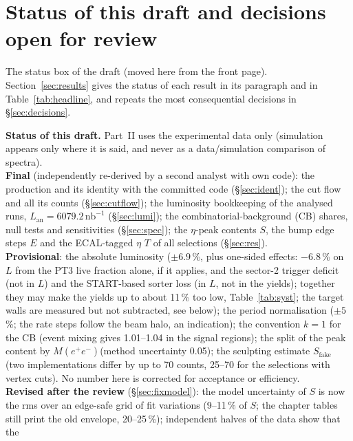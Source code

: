 \documentclass[11pt,a4paper]{article}
\newcommand{\Mee}{\ensuremath{M(e^{+}e^{-})}\xspace}
\newcommand{\nbinv}{\ensuremath{\mathrm{nb}^{-1}}\xspace}
\newcommand{\Lan}{\ensuremath{L_{\mathrm{an}}}\xspace}
\newcommand{\notebox}[1]{\par\noindent\colorbox{orange!10}{\parbox{\dimexpr\linewidth-2\fboxsep\relax}{#1}}\par}
\begin{document}
\section{Status of this draft and decisions open for review}
\label{app:status}
The status box of the draft (moved here from the front page). Section~\ref{sec:results} gives the status of each result in its
paragraph and in Table~\ref{tab:headline}, and repeats the most consequential decisions in \S\ref{sec:decisions}.

\notebox{\textbf{Status of this draft.}
Part~II uses the experimental data only (simulation appears only where it is said, and never as a
data/simulation comparison of spectra).\\[0.3em]
\textbf{Final} (independently re-derived by a second analyst with own code):
the production and its identity with the committed code (\S\ref{sec:ident});
the cut flow and all its counts (\S\ref{sec:cutflow});
the luminosity bookkeeping of the analysed runs, $\Lan = 6079.2\,\nbinv$ (\S\ref{sec:lumi});
the combinatorial-background (CB) shares, null tests and sensitivities (\S\ref{sec:spec});
the $\eta$-peak contents $S$, the bump edge steps $E$ and the ECAL-tagged $\eta$ $T$ of all selections (\S\ref{sec:res}).\\[0.3em]
\textbf{Provisional}: the absolute luminosity ($\pm6.9$\,\%, plus one-sided effects: $-6.8$\,\% on $L$ from the PT3
live fraction alone, if it applies, and the sector-2 trigger deficit (not in $L$) and the START-based sorter loss (in $L$, not in the
yields); together they may make the yields up to about 11\,\% too low, Table~\ref{tab:syst}; the target walls are measured but not
subtracted, see below); the period normalisation ($\pm5$\,\%; the rate steps follow the beam halo, an indication); the convention $k=1$ for the CB (event mixing gives 1.01--1.04 in the signal regions);
the split of the peak content by \Mee (method uncertainty 0.05); the sculpting estimate $S_{\mathrm{fake}}$
(two implementations differ by up to 70 counts, 25--70 for the selections with vertex cuts). No number here is corrected for acceptance or efficiency.\\[0.3em]
\textbf{Revised after the review} (\S\ref{sec:fixmodel}): the model uncertainty of $S$ is now the rms over an edge-safe grid of fit
variations (9--11\,\% of $S$; the chapter tables still print the old envelope, 20--25\,\%); independent halves of the data show that the
}
\end{document}
